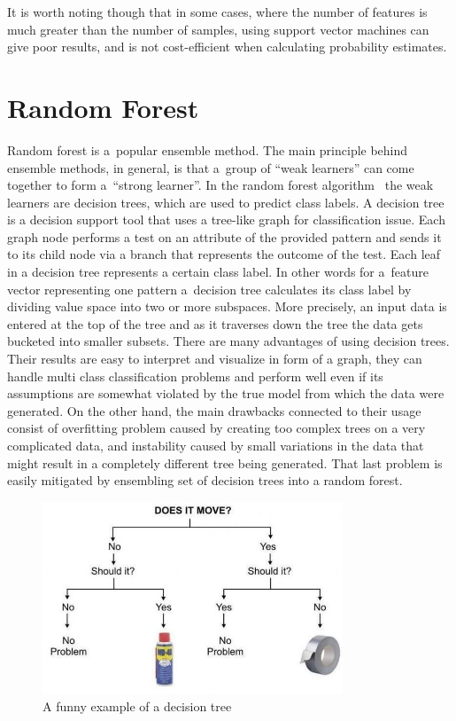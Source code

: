 It is worth noting though that in some cases, where the number of features is much greater than the number of samples, using support vector machines can give poor results, and is not cost-efficient when calculating probability estimates. 

\section{Random Forest}

Random forest is a~popular ensemble method. The main principle behind ensemble methods, in general, is that a~group of ``weak learners'' can come together to form a~``strong learner''. In the random forest algorithm~\cite{Breiman2001} the weak learners are decision trees, which are used to predict class labels. A decision tree is a decision support tool that uses a tree-like graph for classification issue. Each graph node performs a test on an attribute of the provided pattern and sends it to its child node via a branch that represents the outcome of the test. Each leaf in a decision tree represents a certain class label. In other words for a~feature vector representing one pattern a~decision tree calculates its class label by dividing value space into two or more subspaces. More precisely, an input data is entered at the top of the tree and as it traverses down the tree the data gets bucketed into smaller subsets. There are many advantages of using decision trees. Their results are easy to interpret and visualize in form of a graph, they can handle multi class classification problems and perform well even if its assumptions are somewhat violated by the true model from which the data were generated. On the other hand, the main drawbacks connected to their usage consist of overfitting problem caused by creating too complex trees on a very complicated data, and instability caused by small variations in the data that might result in a completely different tree being generated. That last problem is easily mitigated by ensembling set of decision trees into a random forest. 

\begin{figure}[htp]
	\centering
	\includegraphics[width=0.8\textwidth]{Figures/rf_visualization_funny.jpg}
	\caption{A funny example of a decision tree}
	\label{fig:rf_visualization_funny}\vspace{-3pt}
\end{figure}

